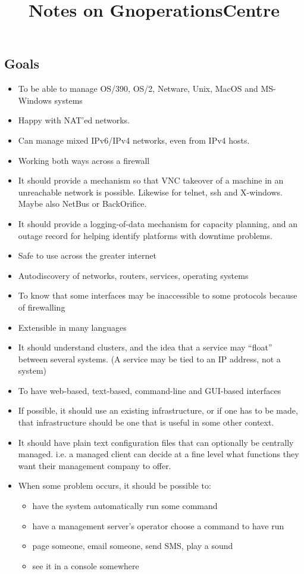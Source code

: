 \documentclass[a4paper]{article}
\title{Notes on GnoperationsCentre}
\begin{document}
\maketitle
\newcommand{\gnopc}[0]{ \textsf{Gnopc} }
\begin{itemize}


\section{Goals}

\begin{itemize}
\item To be able to manage OS/390, OS/2,  Netware, Unix, MacOS and MS-Windows
 systems
\item Happy with NAT'ed networks.
\item Can manage mixed IPv6/IPv4 networks, even from IPv4 hosts.
\item Working both ways across a firewall
\item It should provide a mechanism so that VNC takeover of a machine in
 an unreachable network is possible.  Likewise for telnet, ssh and X-windows.
 Maybe also NetBus or BackOrifice.
\item It should provide a logging-of-data mechanism for capacity planning,
and an outage record for helping identify platforms with downtime problems.
\item Safe to use across the greater internet
\item Autodiscovery of networks, routers, services, operating systems
\item To know that some interfaces may be inaccessible to some
protocols because of firewalling
\item Extensible in many languages
\item It should understand clusters,  and the idea that a service may
 ``float'' between several systems.  (A service may be tied to an IP 
 address, not a system)
\item To have web-based, text-based, command-line and GUI-based interfaces
\item If possible,  it should use an existing infrastructure,  or if one
has to be made,  that infrastructure should be one that is useful in some
other context.
\item It should have plain text configuration files that can optionally
be centrally managed.  i.e.  a managed client can decide at a fine level
what functions they want their management company to offer.
\item When some problem occurs,  it should be possible to:
  \begin{itemize}
  \item have the system automatically run some command
  \item have a management server's operator choose a command to have run
  \item page someone,  email someone,  send SMS,  play a sound
  \item see it in a console somewhere
  \end{itemize}
\end{itemize}


\end{itemize}
\end{document}
